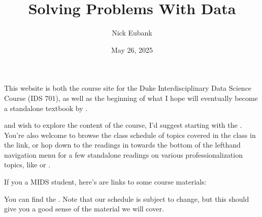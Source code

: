 \documentclass[letterpaper,10pt,english]{jupyterBook}
\title{Solving Problems With Data}
\date{May 26, 2025}
\author{Nick Eubank}
\begin{document}
\pagestyle{empty}
\sphinxmaketitle
\pagestyle{plain}
\sphinxtableofcontents
\pagestyle{normal}
\label{\detokenize{landing_page::doc}}


\sphinxAtStartPar
This website is both the course site for the Duke Interdisciplinary Data Science Course  (IDS 701), as well as the beginning of what I hope will eventually become a stand\sphinxhyphen{}alone textbook by .

\sphinxAtStartPar
{} and wish to explore the content of the course, I’d suggest starting with the {\hyperref[\detokenize{10_introduction/10_solving_problems_with_data::doc}]{}}. You’re also welcome to browse the class schedule of topics covered in the class in the {\hyperref[\detokenize{00_class_schedule/class_schedule::doc}]{}} link, or hop down to the readings in  towards the bottom of the left\sphinxhyphen{}hand navigation menu for a few stand\sphinxhyphen{}alone readings on various professionalization topics, like {\hyperref[\detokenize{40_in_practice/25_writing_to_stakeholders::doc}]{}} or {\hyperref[\detokenize{40_in_practice/30_giving_feedback::doc}]{}}.

\sphinxAtStartPar
If you  a MIDS student, here’s are links to some course materials:

\begin{DUlineblock}{0em}
\item[] 
\end{DUlineblock}

\sphinxAtStartPar
You can find the {\hyperref[\detokenize{00_class_schedule/class_schedule::doc}]{}}. Note that our schedule is subject to change, but this should give you a good sense of the material we will cover.

\begin{DUlineblock}{0em}
\item[] 
\end{DUlineblock}
\end{document}

